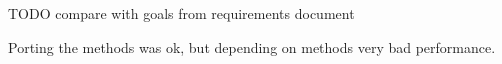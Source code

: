 TODO compare with goals from requirements document

Porting the methods was ok, but depending on methods very bad performance.

